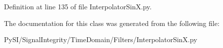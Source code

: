 Definition at line 135 of file Interpolator\+Sin\+X.\+py.



The documentation for this class was generated from the following file\+:\begin{DoxyCompactItemize}
\item 
Py\+S\+I/\+Signal\+Integrity/\+Time\+Domain/\+Filters/Interpolator\+Sin\+X.\+py\end{DoxyCompactItemize}
